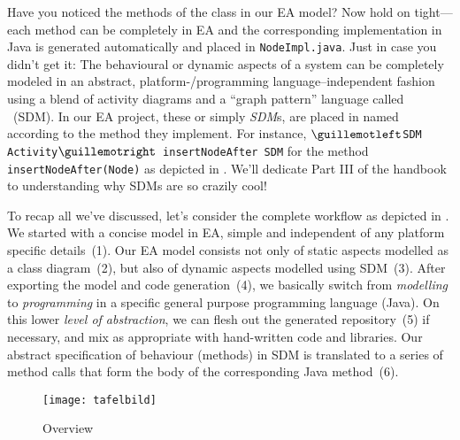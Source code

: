 Have you noticed the methods of the  class in our EA model? 
Now hold on tight---each method can be  completely in EA and the corresponding implementation in Java is generated automatically and placed in \texttt{NodeImpl.java}.
Just in case you didn't get it: The behavioural or dynamic aspects of a system can be completely modeled in an abstract, platform-/programming language--independent fashion using a blend of activity diagrams and a \enquote{graph pattern} language called ~(SDM).
In our EA project, these  or simply \emph{SDM}s, are placed in  named according to the method they implement.
For instance, \texttt{$\guillemotleft$SDM Activity$\guillemotright$ insertNodeAfter SDM} for the method \texttt{in\-sert\-NodeAft\-er(Node)} as depicted in .
We'll dedicate Part III of the handbook to understanding why SDMs are so  {\huge crazily} cool!

To recap all we've discussed, let's consider the complete workflow as depicted in . We started with a concise model in EA, simple and
independent of any platform specific details~(1).  Our EA model consists not only of static aspects modelled as a class diagram~(2), but also of dynamic aspects
modelled using SDM~(3).  After exporting the model and code generation~(4), we basically switch from \emph{modelling} to \emph{programming} in a specific
general purpose programming language (Java). On this lower \emph{level of abstraction}, we can flesh out the generated repository~(5) if necessary, and mix as
appropriate with hand-written code and libraries.  Our abstract specification of behaviour (methods) in SDM is translated to a series of method calls that form
the body of the corresponding Java method~(6).

\begin{figure}[htbp]
	\centering
  \texttt{[image: tafelbild]}
	\caption{Overview}
	\label{fig:Overview}
\end{figure}


\clearpage